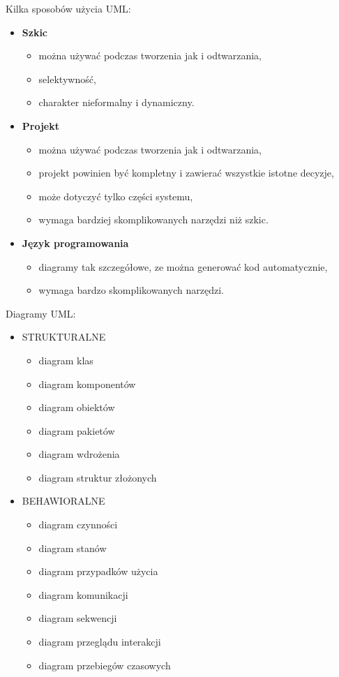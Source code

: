 \documentclass[a4paper]{article}
\begin{document}
Kilka sposobów użycia UML:
    \begin{itemize}
        \item \textbf{Szkic}
        \begin{itemize}
            \item można używać podczas tworzenia jak i odtwarzania,
            \item selektywność,
            \item charakter nieformalny i dynamiczny.
        \end{itemize}
        \item \textbf{Projekt}
        \begin{itemize}
            \item można używać podczas tworzenia jak i odtwarzania,
            \item projekt powinien być kompletny i zawierać wszystkie istotne decyzje,
            \item może dotyczyć tylko części systemu,
            \item wymaga bardziej skomplikowanych narzędzi niż szkic.
        \end{itemize}
        \item \textbf{Język programowania}
        \begin{itemize}
            \item diagramy tak szczegółowe, ze można generować kod automatycznie,
            \item wymaga bardzo skomplikowanych narzędzi.
        \end{itemize}
    \end{itemize}

Diagramy UML:
    \begin{itemize}
        \item STRUKTURALNE
        \begin{itemize}
            \item diagram klas
            \item diagram komponentów
            \item diagram obiektów
            \item diagram pakietów
            \item diagram wdrożenia
            \item diagram struktur złożonych
        \end{itemize}
        \item BEHAWIORALNE
        \begin{itemize}
            \item diagram czynności
            \item diagram stanów
            \item diagram przypadków użycia
            \item diagram komunikacji
            \item diagram sekwencji
            \item diagram przeglądu interakcji
            \item diagram przebiegów czasowych
        \end{itemize}
    \end{itemize}
\end{document}
